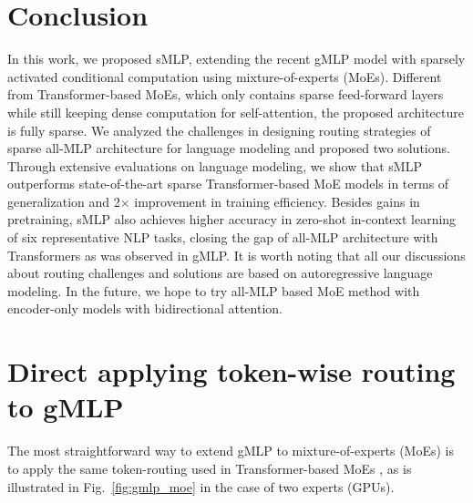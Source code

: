 \documentclass{article}
\begin{document}
 \section{Conclusion}
\label{sec:conclusion}

In this work, we proposed sMLP, extending the recent gMLP \citep{gmlp} model with sparsely activated conditional computation using mixture-of-experts (MoEs). Different from Transformer-based MoEs, which only contains sparse feed-forward layers while still keeping dense computation for self-attention, the proposed architecture is fully sparse. We analyzed the challenges in designing routing strategies of sparse all-MLP architecture for language modeling and proposed two solutions. Through extensive evaluations on language modeling, we show that sMLP outperforms state-of-the-art sparse Transformer-based MoE models in terms of generalization and 2$\times$ improvement in training efficiency. Besides gains in pretraining, sMLP also achieves higher accuracy in zero-shot in-context learning of six representative NLP tasks, closing the gap of all-MLP architecture with Transformers as was observed in gMLP.   
It is worth noting that all our discussions about routing challenges and solutions are based on autoregressive language modeling. In the future, we hope to try all-MLP based MoE method with encoder-only models with bidirectional attention.













 

\nocite{langley00}







\newpage

\appendix
\section{Direct applying token-wise routing to gMLP}
\label{sec:challenges}

The most straightforward way to extend gMLP \citep{gmlp} to mixture-of-experts (MoEs) is to apply the same token-routing used in Transformer-based MoEs \citep{gshard,switch,baselayer,hashlayer}, as is illustrated in Fig.~\ref{fig:gmlp_moe} in the case of two experts (GPUs). 
\end{document}
